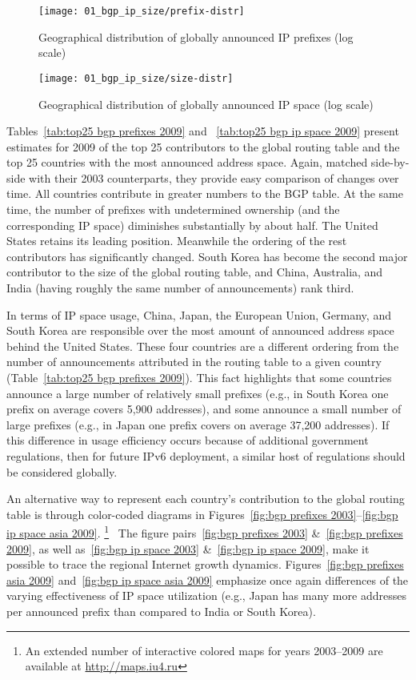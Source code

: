 \begin{figure}[htbp]
	\centering
		\texttt{[image: 01\_bgp\_ip\_size/prefix-distr]}
	\caption{Geographical distribution of globally announced IP prefixes (log scale)}
	\label{fig:prefix distr}
\end{figure}

\begin{figure}[htbp]
	\centering
		\texttt{[image: 01\_bgp\_ip\_size/size-distr]}
	\caption{Geographical distribution of globally announced IP space (log scale)}
	\label{fig:size distr}
\end{figure}

Tables~\ref{tab:top25 bgp prefixes 2009} and ~\ref{tab:top25 bgp ip space 2009}
present estimates for 2009 of the top 25 contributors to the global routing
table and the top 25 countries with the most announced address space. Again,
matched side-by-side with their 2003 counterparts, they provide easy comparison
of changes over time.  All countries contribute in greater numbers to the BGP
table. At the same time, the number of prefixes with undetermined ownership
(and the corresponding IP space) diminishes substantially by about half. The
United States retains its leading position. Meanwhile the ordering of the rest
contributors has significantly changed. South Korea has become the second major
contributor to the size of the global routing table, and China, Australia, and
India (having roughly the same number of announcements) rank third.

In terms of IP space usage, China, Japan, the European Union, Germany, and
South Korea are responsible over the most amount of announced address space
behind the United States. These four countries are a different ordering from
the number of announcements attributed in the routing table to a given country
(Table~\ref{tab:top25 bgp prefixes 2009}). This fact highlights that some
countries announce a large number of relatively small prefixes (e.g., in South
Korea one prefix on average covers 5,900 addresses), and some announce a small
number of large prefixes (e.g., in Japan one prefix covers on average 37,200
addresses). If this difference in usage efficiency occurs because of additional
government regulations, then for future IPv6 deployment, a similar host of
regulations should be considered globally.


An alternative way to represent each country's contribution to the global
routing table is through color-coded diagrams in Figures~\ref{fig:bgp prefixes
2003}--\ref{fig:bgp ip space asia 2009}.%
%
\footnote{%
An extended number of interactive colored maps for years 2003--2009 are
available at \url{http://maps.iu4.ru}}%
%
~The figure pairs~\ref{fig:bgp prefixes 2003} \&~\ref{fig:bgp prefixes 2009},
as well as~\ref{fig:bgp ip space 2003} \&~\ref{fig:bgp ip space 2009}, make it
possible to trace the regional Internet growth dynamics. Figures~\ref{fig:bgp
prefixes asia 2009} and~\ref{fig:bgp ip space asia 2009} emphasize once again
differences of the varying effectiveness of IP space utilization (e.g., Japan
has many more addresses per announced prefix than compared to India or South
Korea).



